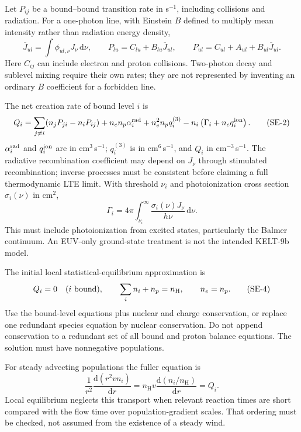 \documentclass[11pt,a4paper]{article}
\newcommand{\dd}{\mathrm{d}}
\newcommand{\nH}{n_{\mathrm H}}
\begin{document}
Let $P_{ij}$ be a bound--bound transition rate in s$^{-1}$, including
collisions and radiation. For a one-photon line, with Einstein $B$ defined
to multiply mean intensity rather than radiation energy density,
\begin{equation}
 \overline J_{ul}=\int\phi_{ul,\nu}J_\nu\,\dd\nu,\qquad
 P_{lu}=C_{lu}+B_{lu}\overline J_{ul},\qquad
 P_{ul}=C_{ul}+A_{ul}+B_{ul}\overline J_{ul}.
 \tag{SE-1}\label{eq:multilevel-rates}
\end{equation}
Here $C_{ij}$ can include electron and proton collisions. Two-photon decay
and sublevel mixing require their own rates; they are not represented by
inventing an ordinary $B$ coefficient for a forbidden line.

The net creation rate of bound level $i$ is
\begin{equation}
 Q_i=\sum_{j\ne i}(n_jP_{ji}-n_iP_{ij})
    +n_en_p\alpha_i^{\rm rad}
    +n_e^2n_pq_i^{(3)}
    -n_i\left(\Gamma_i+n_eq_i^{\rm ion}\right).
 \tag{SE-2}\label{eq:level-balance}
\end{equation}
$\alpha_i^{\rm rad}$ and $q_i^{\rm ion}$ are in cm$^3$\,s$^{-1}$;
$q_i^{(3)}$ is in cm$^6$\,s$^{-1}$, and $Q_i$ in cm$^{-3}$\,s$^{-1}$.
The radiative recombination coefficient may depend on $J_\nu$ through
stimulated recombination; inverse processes must be consistent before
claiming a full thermodynamic LTE limit. With threshold $\nu_i$ and
photoionization cross section $\sigma_i(\nu)$ in cm$^2$,
\begin{equation}
 \Gamma_i=4\pi\int_{\nu_i}^{\infty}
    \frac{\sigma_i(\nu)J_\nu}{h\nu}\,\dd\nu.
 \tag{SE-3}\label{eq:photoionization}
\end{equation}
This must include photoionization from excited states, particularly the
Balmer continuum. An EUV-only ground-state treatment is not the intended
KELT-9b model.

The initial local statistical-equilibrium approximation is
\begin{equation}
 Q_i=0\quad(i\ \hbox{bound}),\qquad
 \sum_i n_i+n_p=\nH,\qquad n_e=n_p.
 \tag{SE-4}\label{eq:conservation}
\end{equation}
Use the bound-level equations plus nuclear and charge conservation, or
replace one redundant species equation by nuclear conservation. Do not append
conservation to a redundant set of all bound and proton balance equations.
The solution must have nonnegative populations.

For steady advecting populations the fuller equation is
\begin{equation}
 \frac{1}{r^2}\frac{\dd(r^2vn_i)}{\dd r}
 =\nH v\frac{\dd(n_i/\nH)}{\dd r}=Q_i.
 \tag{SE-5}\label{eq:population-advection}
\end{equation}
Local equilibrium neglects this transport when relevant reaction times are
short compared with the flow time over population-gradient scales. That
ordering must be checked, not assumed from the existence of a steady wind.
\end{document}
